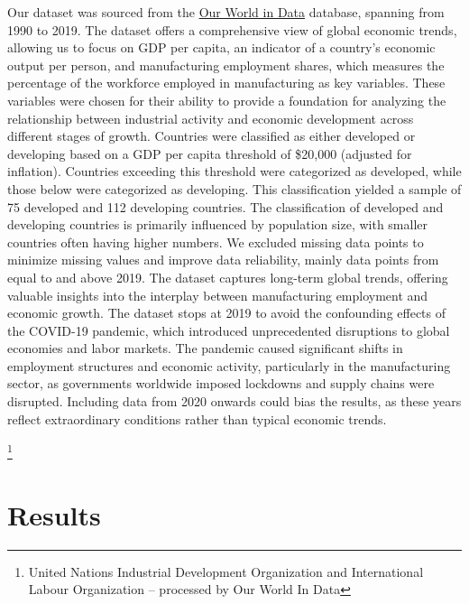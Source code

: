 \documentclass[12pt]{article}
\begin{document}
Our dataset was sourced from the \href{https://ourworldindata.org/}{Our World in Data} database, spanning from 1990 to 2019. The dataset offers a comprehensive view of global economic trends, allowing us to focus on GDP per capita, an indicator of a country's economic output per person, and manufacturing employment shares, which measures the percentage of the workforce employed in manufacturing as key variables. These variables were chosen for their ability to provide a foundation for analyzing the relationship between industrial activity and economic development across different stages of growth.
    Countries were classified as either developed or developing based on a GDP per capita threshold of \$20,000 (adjusted for inflation). Countries exceeding this threshold were categorized as developed, while those below were categorized as developing. This classification yielded a sample of 75 developed and 112 developing countries. The classification of developed and developing countries is primarily influenced by population size, with smaller countries often having higher numbers. We excluded missing data points to minimize missing values and improve data reliability, mainly data points from equal to and above 2019. The dataset captures long-term global trends, offering valuable insights into the interplay between manufacturing employment and economic growth.
    The dataset stops at 2019 to avoid the confounding effects of the COVID-19 pandemic, which introduced unprecedented disruptions to global economies and labor markets. The pandemic caused significant shifts in employment structures and economic activity, particularly in the manufacturing sector, as governments worldwide imposed lockdowns and supply chains were disrupted. Including data from 2020 onwards could bias the results, as these years reflect extraordinary conditions rather than typical economic trends.

\footnote{United Nations Industrial Development Organization and International Labour Organization – processed by Our World In Data}

\section{Results}
\label{sec:result}
\end{document}
